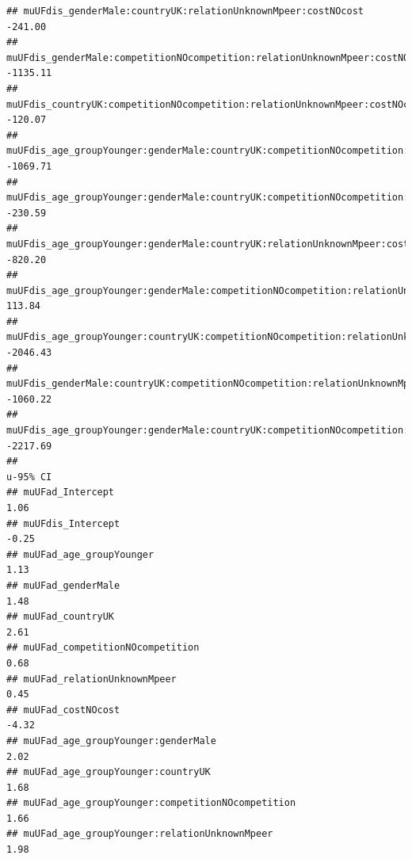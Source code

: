 \documentclass[
]{article}
\begin{document}
\begin{verbatim}
## muUFdis_genderMale:countryUK:relationUnknownMpeer:costNOcost                                            -241.00
## muUFdis_genderMale:competitionNOcompetition:relationUnknownMpeer:costNOcost                            -1135.11
## muUFdis_countryUK:competitionNOcompetition:relationUnknownMpeer:costNOcost                              -120.07
## muUFdis_age_groupYounger:genderMale:countryUK:competitionNOcompetition:relationUnknownMpeer            -1069.71
## muUFdis_age_groupYounger:genderMale:countryUK:competitionNOcompetition:costNOcost                       -230.59
## muUFdis_age_groupYounger:genderMale:countryUK:relationUnknownMpeer:costNOcost                           -820.20
## muUFdis_age_groupYounger:genderMale:competitionNOcompetition:relationUnknownMpeer:costNOcost             113.84
## muUFdis_age_groupYounger:countryUK:competitionNOcompetition:relationUnknownMpeer:costNOcost            -2046.43
## muUFdis_genderMale:countryUK:competitionNOcompetition:relationUnknownMpeer:costNOcost                  -1060.22
## muUFdis_age_groupYounger:genderMale:countryUK:competitionNOcompetition:relationUnknownMpeer:costNOcost -2217.69
##                                                                                                        u-95% CI
## muUFad_Intercept                                                                                           1.06
## muUFdis_Intercept                                                                                         -0.25
## muUFad_age_groupYounger                                                                                    1.13
## muUFad_genderMale                                                                                          1.48
## muUFad_countryUK                                                                                           2.61
## muUFad_competitionNOcompetition                                                                            0.68
## muUFad_relationUnknownMpeer                                                                                0.45
## muUFad_costNOcost                                                                                         -4.32
## muUFad_age_groupYounger:genderMale                                                                         2.02
## muUFad_age_groupYounger:countryUK                                                                          1.68
## muUFad_age_groupYounger:competitionNOcompetition                                                           1.66
## muUFad_age_groupYounger:relationUnknownMpeer                                                               1.98

\end{verbatim}
\end{document}
